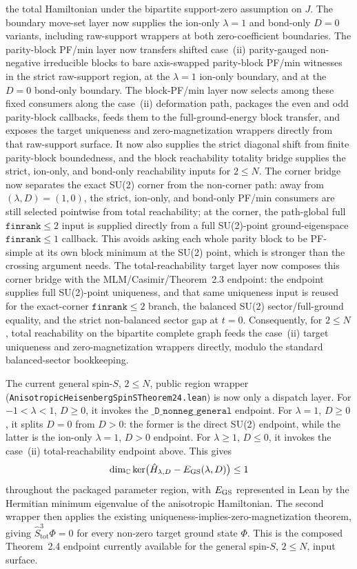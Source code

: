 \documentclass[a4paper,11pt]{article}
\begin{document}
the total Hamiltonian under the bipartite support-zero assumption on \(J\).  The
boundary move-set layer now supplies the ion-only \(\lambda=1\) and bond-only
\(D=0\) variants, including raw-support wrappers at both zero-coefficient
boundaries.  The parity-block PF/min layer now transfers shifted case~(ii)
parity-gauged non-negative irreducible blocks to bare axis-swapped
parity-block PF/min witnesses in the strict raw-support region, at the
\(\lambda=1\) ion-only boundary, and at the \(D=0\) bond-only boundary.  The
block-PF/min layer now selects among these fixed consumers along the
case~(ii) deformation path, packages the even and odd parity-block callbacks,
feeds them to the full-ground-energy block transfer, and exposes the target
uniqueness and zero-magnetization wrappers directly from that raw-support
surface.  It now also supplies the strict diagonal shift from finite
parity-block boundedness, and the block reachability totality bridge supplies
the strict, ion-only, and bond-only reachability inputs for \(2\le N\).  The
corner bridge now separates the exact SU(2) corner from the non-corner path:
away from \((\lambda,D)=(1,0)\), the strict, ion-only, and bond-only PF/min
consumers are still selected pointwise from total reachability; at the corner,
the path-global full \(\texttt{finrank}\le2\) input is supplied directly from
a full SU(2)-point ground-eigenspace \(\texttt{finrank}\le1\) callback.  This
avoids asking each whole parity block to be PF-simple at its own block minimum
at the SU(2) point, which is stronger than the crossing argument needs.  The
total-reachability target layer now composes this corner bridge with the
MLM/Casimir/Theorem~2.3 endpoint: the endpoint supplies full SU(2)-point
uniqueness, and that same uniqueness input is reused for the exact-corner
\(\texttt{finrank}\le2\) branch, the balanced SU(2) sector/full-ground
equality, and the strict non-balanced sector gap at \(t=0\).  Consequently,
for \(2\le N\), total reachability on the bipartite complete graph feeds the
case~(ii) target uniqueness and zero-magnetization wrappers directly, modulo
the standard balanced-sector bookkeeping.

The current general spin-\(S\), \(2\le N\), public region wrapper
(\texttt{AnisotropicHeisenbergSpinSTheorem24.lean}) is now only a dispatch
layer.  For \(-1<\lambda<1\), \(D\ge0\), it invokes the
\(\texttt{\_D\_nonneg\_general}\) endpoint.  For \(\lambda=1\), \(D\ge0\), it
splits \(D=0\) from \(D>0\): the former is the direct SU(2) endpoint, while the
latter is the ion-only \(\lambda=1\), \(D>0\) endpoint.  For
\(\lambda\ge1\), \(D\le0\), it invokes the case~(ii) total-reachability
endpoint above.  This gives
\[
  \dim_{\mathbb C}\ker\bigl(\hat H_{\lambda,D}
    - E_{\rm GS}(\lambda,D)\bigr) \le 1
\]
throughout the packaged parameter region, with \(E_{\rm GS}\) represented in
Lean by the Hermitian minimum eigenvalue of the anisotropic Hamiltonian.  The
second wrapper then applies the existing uniqueness-implies-zero-magnetization
theorem, giving \(\hat S^3_{\mathrm{tot}}\Phi=0\) for every non-zero target
ground state \(\Phi\).  This is the composed Theorem~2.4 endpoint currently
available for the general spin-\(S\), \(2\le N\), input surface.
\end{document}

